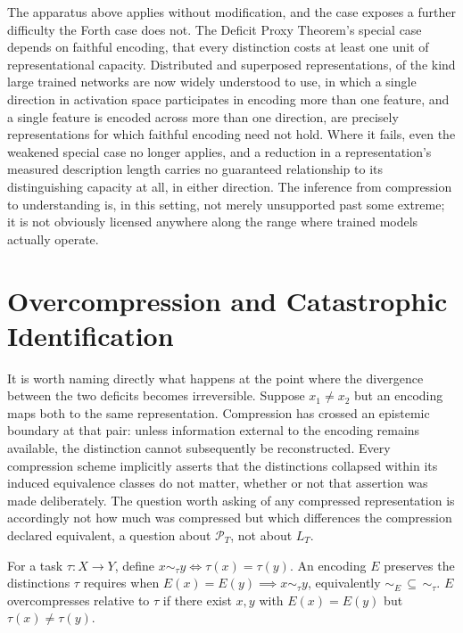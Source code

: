 The apparatus above applies without modification, and the case exposes a further difficulty the Forth case does not. The Deficit Proxy Theorem's special case depends on faithful encoding, that every distinction costs at least one unit of representational capacity. Distributed and superposed representations, of the kind large trained networks are now widely understood to use, in which a single direction in activation space participates in encoding more than one feature, and a single feature is encoded across more than one direction, are precisely representations for which faithful encoding need not hold. Where it fails, even the weakened special case no longer applies, and a reduction in a representation's measured description length carries no guaranteed relationship to its distinguishing capacity at all, in either direction. The inference from compression to understanding is, in this setting, not merely unsupported past some extreme; it is not obviously licensed anywhere along the range where trained models actually operate.

\section{Overcompression and Catastrophic Identification}

It is worth naming directly what happens at the point where the divergence between the two deficits becomes irreversible. Suppose $x_1 \neq x_2$ but an encoding maps both to the same representation. Compression has crossed an epistemic boundary at that pair: unless information external to the encoding remains available, the distinction cannot subsequently be reconstructed. Every compression scheme implicitly asserts that the distinctions collapsed within its induced equivalence classes do not matter, whether or not that assertion was made deliberately. The question worth asking of any compressed representation is accordingly not how much was compressed but which differences the compression declared equivalent, a question about $\mathcal{P}_T$, not about $L_T$.

\begin{definition}
For a task $\tau : X \to Y$, define $x \sim_\tau y \iff \tau(x) = \tau(y)$. An encoding $E$ preserves the distinctions $\tau$ requires when $E(x) = E(y) \implies x \sim_\tau y$, equivalently $\sim_E\, \subseteq\, \sim_\tau$. $E$ overcompresses relative to $\tau$ if there exist $x,y$ with $E(x) = E(y)$ but $\tau(x) \neq \tau(y)$.
\end{definition}

